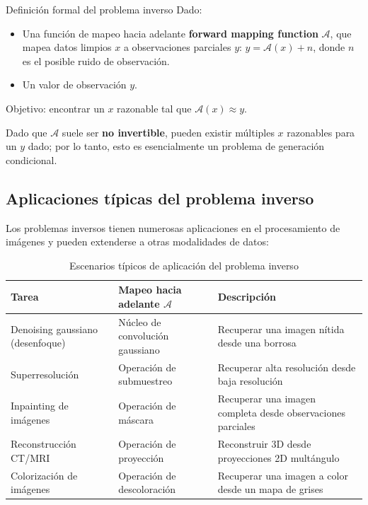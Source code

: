\documentclass[a4paper]{article}
\begin{document}
\begin{importantbox}{Definición formal del problema inverso}
Dado:
\begin{itemize}
    \item Una función de mapeo hacia adelante \textbf{forward mapping function} $\mathcal{A}$, que mapea datos limpios $x$ a observaciones parciales $y$: $y = \mathcal{A}(x) + n$, donde $n$ es el posible ruido de observación.
    \item Un valor de observación $y$.
\end{itemize}
Objetivo: encontrar un $x$ razonable tal que $\mathcal{A}(x) \approx y$.

Dado que $\mathcal{A}$ suele ser \textbf{no invertible}, pueden existir múltiples $x$ razonables para un $y$ dado; por lo tanto, esto es esencialmente un problema de generación condicional.
\end{importantbox}

\subsection{Aplicaciones típicas del problema inverso}

Los problemas inversos tienen numerosas aplicaciones en el procesamiento de imágenes y pueden extenderse a otras modalidades de datos:

\begin{table}[H]
\centering
\begin{tabular}{lll}
\toprule
\textbf{Tarea} & \textbf{Mapeo hacia adelante $\mathcal{A}$} & \textbf{Descripción} \\
\midrule
Denoising gaussiano (desenfoque) & Núcleo de convolución gaussiano & Recuperar una imagen nítida desde una borrosa \\
Superresolución & Operación de submuestreo & Recuperar alta resolución desde baja resolución \\
Inpainting de imágenes & Operación de máscara & Recuperar una imagen completa desde observaciones parciales \\
Reconstrucción CT/MRI & Operación de proyección & Reconstruir 3D desde proyecciones 2D multángulo \\
Colorización de imágenes & Operación de descoloración & Recuperar una imagen a color desde un mapa de grises \\
\bottomrule
\end{tabular}
\caption{Escenarios típicos de aplicación del problema inverso}
\end{table}
\end{document}
